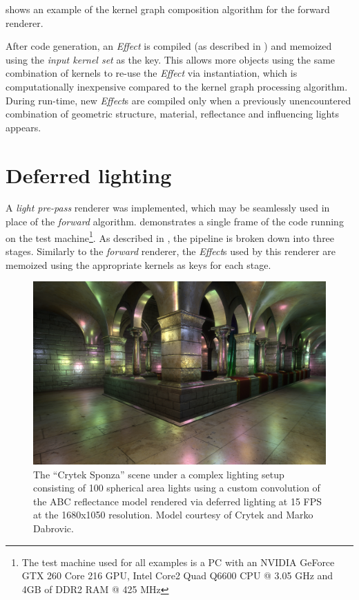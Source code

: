 shows an example of the kernel graph composition algorithm for the forward renderer.

After code generation, an \emph{Effect} is compiled (as described in ) and memoized using the \emph{input kernel set} as the key. This allows more objects using the same combination of kernels to re-use the \emph{Effect} via instantiation, which is computationally inexpensive compared to the kernel graph processing algorithm. During run-time, new \emph{Effect}s are compiled only when a previously unencountered combination of geometric structure, material, reflectance and influencing lights appears.

\clearpage
\section{Deferred lighting}
\label{sec:DeferredLightingExample}

A \emph{light pre-pass} renderer was implemented, which may be seamlessly used in place of the \emph{forward} algorithm.  demonstrates a single frame of the code running on the test machine\footnote{The test machine used for all examples is a PC with an NVIDIA GeForce GTX 260 Core 216 GPU, Intel Core2 Quad Q6600 CPU @ 3.05 GHz and 4GB of DDR2 RAM @ 425 MHz}. As described in , the pipeline is broken down into three stages. Similarly to the \emph{forward} renderer, the \emph{Effect}s used by this renderer are memoized using the appropriate kernels as keys for each stage.

\begin{figure}[ht!]
  \centering
    \includegraphics[width=0.9\linewidth]{./Figures/lightPrePass/sponza.jpg}
    \caption[Light pre-pass rendering of Sponza]{The ``Crytek Sponza'' scene under a complex lighting setup consisting of 100 spherical area lights using a custom convolution of the ABC reflectance model rendered via deferred lighting at 15 FPS at the 1680x1050 resolution. Model courtesy of Crytek and Marko Dabrovic.}
  \label{fig:lightPrePassSponza}
\end{figure}

